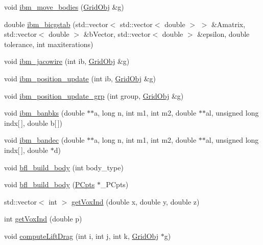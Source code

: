 \begin{DoxyCompactItemize}
\item 
void \hyperlink{class_object_manager_aef4cfcea354469472c0b25bf74757f2b}{ibm\+\_\+move\+\_\+bodies} (\hyperlink{class_grid_obj}{Grid\+Obj} \&g)
\item 
double \hyperlink{class_object_manager_adad4317bfbe5bae833c4ffa3e4538d92}{ibm\+\_\+bicgstab} (std\+::vector$<$ std\+::vector$<$ double $>$ $>$ \&Amatrix, std\+::vector$<$ double $>$ \&b\+Vector, std\+::vector$<$ double $>$ \&epsilon, double tolerance, int maxiterations)
\item 
void \hyperlink{class_object_manager_ae1d5e39f3a837adfc88c4c7ed722c895}{ibm\+\_\+jacowire} (int ib, \hyperlink{class_grid_obj}{Grid\+Obj} \&g)
\item 
void \hyperlink{class_object_manager_a07a4a328974705e440dd303c5c2e0472}{ibm\+\_\+position\+\_\+update} (int ib, \hyperlink{class_grid_obj}{Grid\+Obj} \&g)
\item 
void \hyperlink{class_object_manager_ae9a0efc0b1d088f90b3b16833f948f12}{ibm\+\_\+position\+\_\+update\+\_\+grp} (int group, \hyperlink{class_grid_obj}{Grid\+Obj} \&g)
\item 
void \hyperlink{class_object_manager_a7bf970976700f9949bb08d8dc7f8e637}{ibm\+\_\+banbks} (double $\ast$$\ast$a, long n, int m1, int m2, double $\ast$$\ast$al, unsigned long indx\mbox{[}$\,$\mbox{]}, double b\mbox{[}$\,$\mbox{]})
\item 
void \hyperlink{class_object_manager_a77eb5ec758b5956e0a609fa1fba2f8e8}{ibm\+\_\+bandec} (double $\ast$$\ast$a, long n, int m1, int m2, double $\ast$$\ast$al, unsigned long indx\mbox{[}$\,$\mbox{]}, double $\ast$d)
\item 
void \hyperlink{class_object_manager_a099a446ac7f045d11d6be6babd0a31ab}{bfl\+\_\+build\+\_\+body} (int body\+\_\+type)
\item 
void \hyperlink{class_object_manager_a56c65bd5122aa7e7026fb8d2315482f3}{bfl\+\_\+build\+\_\+body} (\hyperlink{class_p_cpts}{P\+Cpts} $\ast$\+\_\+\+P\+Cpts)
\item 
std\+::vector$<$ int $>$ \hyperlink{class_object_manager_a68230ad49b979c2fe963cb3632a60c3a}{get\+Vox\+Ind} (double x, double y, double z)
\item 
int \hyperlink{class_object_manager_a8e8e70f60dfb9d35d2e320c7c2b3b33c}{get\+Vox\+Ind} (double p)
\item 
void \hyperlink{class_object_manager_a6a35b34d77e7cd56060a6953d0d0860a}{compute\+Lift\+Drag} (int i, int j, int k, \hyperlink{class_grid_obj}{Grid\+Obj} $\ast$g)
\item 

\end{DoxyCompactItemize}
